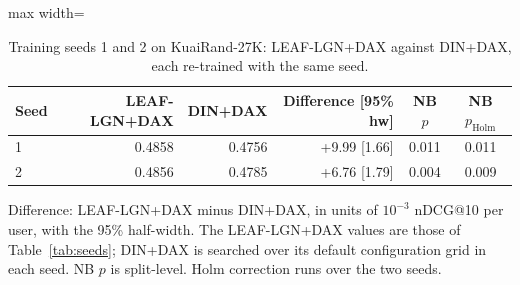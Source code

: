 \begin{table}[tbp]
\centering
\footnotesize
\caption{Training seeds 1 and 2 on KuaiRand-27K: LEAF-LGN+DAX against DIN+DAX, each re-trained with the same seed.}
\label{tab:seeds-din}
\begin{adjustbox}{max width=\linewidth}
\begin{tabular}{lrrrcc}
\toprule
Seed & LEAF-LGN+DAX & DIN+DAX & Difference [95\% hw] & NB $p$ & NB $p_{\mathrm{Holm}}$ \\
\midrule
1 & 0.4858 & 0.4756 & +9.99 [1.66] & 0.011 & 0.011 \\
2 & 0.4856 & 0.4785 & +6.76 [1.79] & 0.004 & 0.009 \\
\bottomrule
\end{tabular}
\end{adjustbox}
\par\smallskip
\begin{minipage}{\linewidth}\raggedright\footnotesize Difference: LEAF-LGN+DAX minus DIN+DAX, in units of $10^{-3}$ nDCG@10 per user, with the 95\% half-width. The LEAF-LGN+DAX values are those of Table~\ref{tab:seeds}; DIN+DAX is searched over its default configuration grid in each seed. NB $p$ is split-level. Holm correction runs over the two seeds.\end{minipage}
\end{table}
